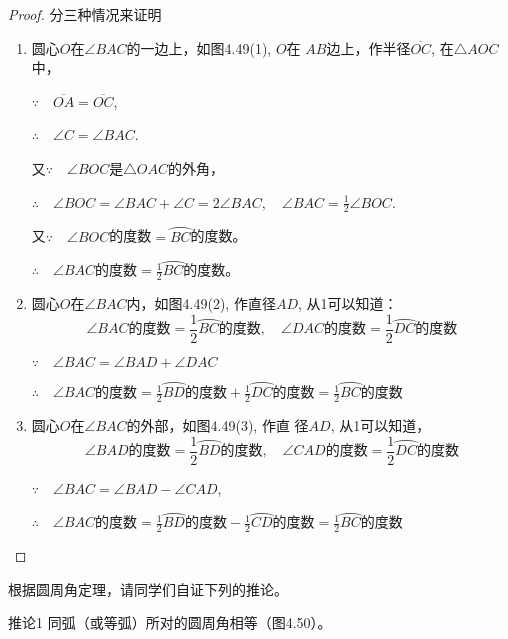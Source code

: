 \begin{proof}
分三种情况来证明
\begin{enumerate}
\item 圆心$O$在$\angle BAC$的一边上，如图4.49(1), $O$在
$AB$边上，作半径$\overline{OC}$, 在$\triangle AOC$中，

$\because \quad \overline{OA}=\overline{OC}$,

$\therefore\quad \angle C=\angle BAC$.

又$\because\quad \angle BOC$是$\triangle OAC$的外角，

$\therefore\quad \angle BOC=\angle BAC+\angle C=2\angle BAC,\quad \angle BAC=\frac{1}{2}\angle BOC$.

又$\because\quad \angle BOC$的度数$=\wideparen{BC}$的度数。

$\therefore\quad \angle BAC$的度数$=\frac{1}{2}\wideparen{BC}$的度数。

\item 圆心$O$在$\angle BAC$内，如图4.49(2), 
作直径$AD$, 从1可以知道：
\[\angle BAC\text{的度数}=\frac{1}{2}\wideparen{BC}\text{的度数},\quad \angle DAC\text{的度数}=\frac{1}{2}\wideparen{DC}\text{的度数}\]

$\because\quad \angle BAC=\angle BAD+\angle DAC$

$\therefore\quad \angle BAC\text{的度数}=\frac{1}{2}\wideparen{BD}\text{的度数}+\frac{1}{2}\wideparen{DC}\text{的度数}=\frac{1}{2}\wideparen{BC}\text{的度数}$

\item 圆心$O$在$\angle BAC$的外部，如图4.49(3), 作直
径$AD$, 从1可以知道，
\[\angle BAD\text{的度数}=\frac{1}{2}\wideparen{BD}\text{的度数},\quad \angle CAD\text{的度数}=\frac{1}{2}\wideparen{DC}\text{的度数}\]

$\because\quad \angle BAC=\angle BAD-\angle CAD$,

$\therefore\quad \angle BAC\text{的度数}=\frac{1}{2}\wideparen{BD}\text{的度数}-\frac{1}{2}\wideparen{CD}\text{的度数}=\frac{1}{2}\wideparen{BC}\text{的度数}$
\end{enumerate}
\end{proof}

根据圆周角定理，请同学们自证下列的推论。

\begin{blk}{推论1} 
同弧（或等弧）所对的圆周角相等（图4.50）。
\end{blk}

